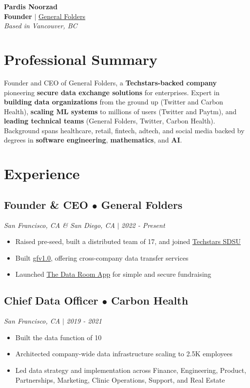 \documentclass[11pt,letterpaper]{article}
\renewcommand{\maketitle}{%
    {\Huge\bfseries\color{textcolor} Pardis Noorzad}\\[0.8em]
    {\large\bfseries Founder} $|$ \href{https://generalfolders.com}{General Folders}\\[0.2em]
    {\large\itshape Based in Vancouver, BC}
    \vspace{0.5em}
}
\begin{document}
\maketitle

\section*{Professional Summary}

Founder and CEO of General Folders, a \textbf{Techstars-backed company} pioneering \textbf{secure data exchange solutions} for enterprises. Expert in \textbf{building data organizations} from the ground up (Twitter and Carbon Health), \textbf{scaling ML systems} to millions of users (Twitter and Paytm), and \textbf{leading technical teams} (General Folders, Twitter, Carbon Health). Background spans healthcare, retail, fintech, adtech, and social media backed by degrees in \textbf{software engineering}, \textbf{mathematics}, and \textbf{AI}.

\section*{Experience}

\subsection*{\textbf{Founder \& CEO} $\bullet$ General Folders}
\textit{San Francisco, CA \& San Diego, CA} $|$ \textit{2022 - Present}

\begin{itemize}
    \item Raised pre-seed, built a distributed team of 17, and joined \href{https://www.techstars.com/newsroom/new-class-san-diego-sdsu}{Techstars SDSU}
    \item Built \href{https://generalfolders.com}{gfv1.0}, offering cross-company data transfer services
    \item Launched \href{https://thedataroom.app}{The Data Room App} for simple and secure fundraising
\end{itemize}

\subsection*{\textbf{Chief Data Officer} $\bullet$ Carbon Health}
\textit{San Francisco, CA} $|$ \textit{2019 - 2021}

\begin{itemize}
    \item Built the data function of 10
    \item Architected company-wide data infrastructure scaling to 2.5K employees
    \item Led data strategy and implementation across Finance, Engineering, Product, Partnerships, Marketing, Clinic Operations, Support, and Real Estate
\end{itemize}
\end{document}
